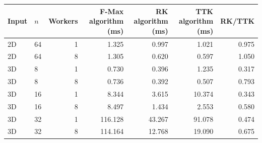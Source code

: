 \begin{tabular}{llrrrrr}
\hline
Input & $n$ & Workers & F-Max algorithm (ms) & RK algorithm (ms) & TTK algorithm (ms) & RK/TTK \\
\hline
2D & 64 & 1 & 1.325 & 0.997 & 1.021 & 0.975 \\
2D & 64 & 8 & 1.305 & 0.620 & 0.597 & 1.050 \\
3D & 8 & 1 & 0.730 & 0.396 & 1.235 & 0.317 \\
3D & 8 & 8 & 0.736 & 0.392 & 0.507 & 0.793 \\
3D & 16 & 1 & 8.344 & 3.615 & 10.374 & 0.343 \\
3D & 16 & 8 & 8.497 & 1.434 & 2.553 & 0.580 \\
3D & 32 & 1 & 116.128 & 43.267 & 91.078 & 0.474 \\
3D & 32 & 8 & 114.164 & 12.768 & 19.090 & 0.675 \\
\hline
\end{tabular}
